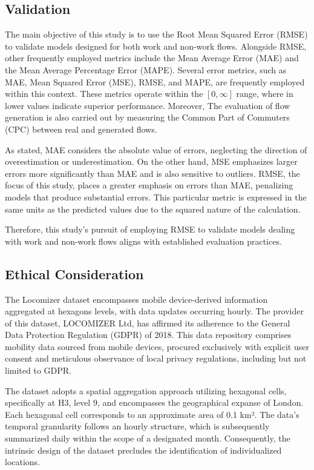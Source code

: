 \subsection{Validation}

The main objective of this study is to use the Root Mean Squared Error (RMSE) to validate models designed for both work and non-work flows. Alongside RMSE, other frequently employed metrics include the Mean Average Error (MAE) and the Mean Average Percentage Error (MAPE). Several error metrics, such as MAE, Mean Squared Error (MSE), RMSE, and MAPE, are frequently employed within this context. These metrics operate within the $[0, \infty ]$ range, where in lower values indicate superior performance. Moreover, The evaluation of flow generation is also carried out by measuring the Common Part of Commuters (CPC) between real and generated flows\citep{lucaSurveyDeepLearning2021}.

As \cite{lucaSurveyDeepLearning2021} stated, MAE considers the absolute value of errors, neglecting the direction of overestimation or underestimation. On the other hand, MSE emphasizes larger errors more significantly than MAE and is also sensitive to outliers. RMSE, the focus of this study, places a greater emphasis on errors than MAE, penalizing models that produce substantial errors. This particular metric is expressed in the same units as the predicted values due to the squared nature of the calculation.

Therefore, this study's pursuit of employing RMSE to validate models dealing with work and non-work flows aligns with established evaluation practices. 

\subsection{Ethical Consideration}

The Locomizer dataset encompasses mobile device-derived information aggregated at hexagons levels, with data updates occurring hourly. The provider of this dataset, LOCOMIZER Ltd, has affirmed its adherence to the General Data Protection Regulation (GDPR) of 2018. This data repository comprises mobility data sourced from mobile devices, procured exclusively with explicit user consent and meticulous observance of local privacy regulations, including but not limited to GDPR.

The dataset adopts a spatial aggregation approach utilizing hexagonal cells, specifically at H3, level 9, and encompasses the geographical expanse of London. Each hexagonal cell corresponds to an approximate area of 0.1 km². The data's temporal granularity follows an hourly structure, which is subsequently summarized daily within the scope of a designated month. Consequently, the intrinsic design of the dataset precludes the identification of individualized locations.

